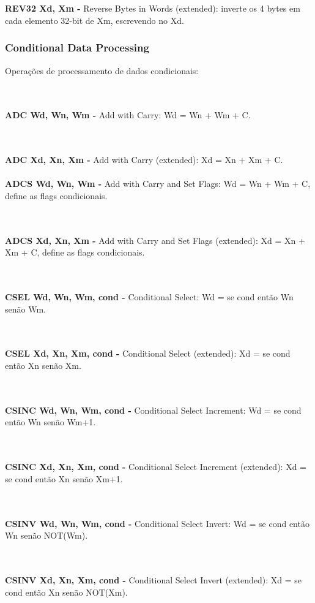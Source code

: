 \documentclass[12pt,a4paper,utf8]{ppgsi}
\begin{document}
\\\\\textbf{REV32 Xd, Xm -} Reverse Bytes in Words (extended): inverte os 4 bytes em cada elemento 32-bit de Xm, escrevendo no Xd. 


\subsubsection{Conditional Data Processing}
Operações de processamento de dados condicionais:

\\\\\textbf{ADC Wd, Wn, Wm -} Add with Carry: Wd = Wn + Wm + C. 

\\\\\textbf{ADC Xd, Xn, Xm -} Add with Carry (extended): Xd = Xn + Xm + C. 
\\\\\textbf{ADCS Wd, Wn, Wm -} Add with Carry and Set Flags: Wd = Wn + Wm + C, define as flags condicionais. 

\\\\\textbf{ADCS Xd, Xn, Xm -} Add with Carry and Set Flags (extended): Xd = Xn + Xm + C, define as flags condicionais. 

\\\\\textbf{CSEL Wd, Wn, Wm, cond -} Conditional Select: Wd = se cond então Wn senão Wm.

\\\\\textbf{CSEL Xd, Xn, Xm, cond -} Conditional Select (extended): Xd = se cond então Xn senão Xm. 

\\\\\textbf{CSINC Wd, Wn, Wm, cond -} Conditional Select Increment: Wd = se cond então Wn senão Wm+1. 

\\\\\textbf{CSINC Xd, Xn, Xm, cond -} Conditional Select Increment (extended): Xd = se cond então Xn senão Xm+1. 

\\\\\textbf{CSINV Wd, Wn, Wm, cond -} Conditional Select Invert: Wd = se cond então Wn senão NOT(Wm). 

\\\\\textbf{CSINV Xd, Xn, Xm, cond -} Conditional Select Invert (extended): Xd = se cond então Xn senão NOT(Xm). 
\end{document}
